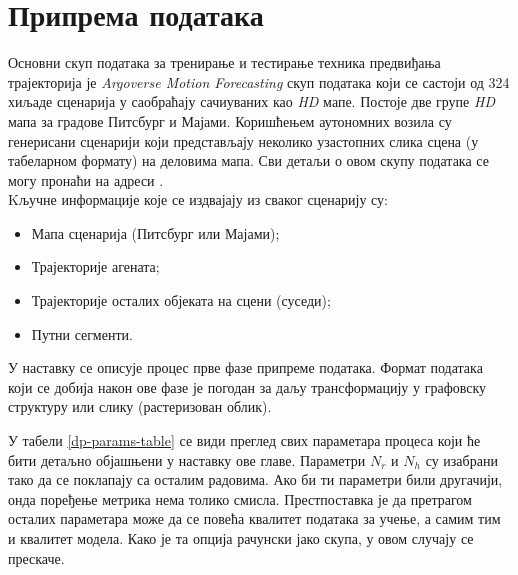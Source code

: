 \documentclass[11pt,oneside]{memoir}
\begin{document}
\chapter{Припрема података \label{initprep}}

Основни скуп података за тренирање и тестирање техника предвиђања трајекторија је \textit{Argoverse Motion Forecasting} скуп података
који се састоји од 324 хиљаде сценарија у саобраћају сачиуваних као \textit{HD} мапе. Постоје две групе \textit{HD} мапа
за градове Питсбург и Мајами. Коришћењем аутономних возила су генерисани сценарији који представљају неколико узастопних слика сцена (у табеларном формату)
на деловима мапа. Сви детаљи о овом скупу података се могу пронаћи на адреси 
\href{https://www.argoverse.org/index.html}{\color{blue}{www.argoverse.org}} \cite{argoverse}. \\


\noindent Kључне информације које се издвајају из сваког сценарију су:
\begin{itemize}
  \item Мапа сценарија (Питсбург или Мајами);
  \item Трајекторије агената;
  \item Трајекторије осталих објеката на сцени (суседи);
  \item Путни сегменти.
\end{itemize}

У наставку се описује процес прве фазе припреме података. Формат података који се добија након ове фазе је погодан
за даљу трансформацију у графовску структуру или слику (растеризован облик).

У табели \ref{dp-params-table} се види преглед свих параметара процеса који ће
бити детаљно објашњени у наставку ове главе. Параметри $N_r$ и $N_h$ су изабрани тако да се поклапају
са осталим радовима. Ако би ти параметри били другачији, онда поређење метрика нема толико смисла. 
Престпоставка је да претрагом осталих параметара може да се повећа квалитет података за учење, а самим тим
и квалитет модела. Како је та опција рачунски јако скупа, у овом случају се прескаче.
\end{document}
